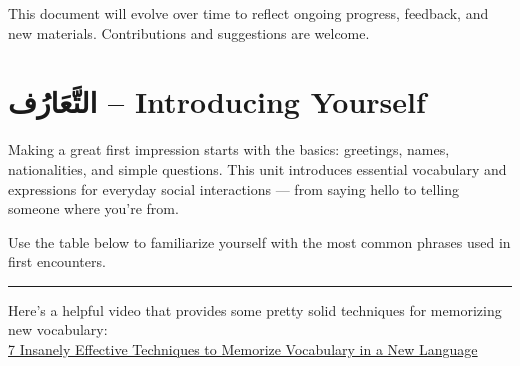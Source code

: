 \documentclass[
  a4paper,
  DIV=11,
  numbers=noendperiod]{scrartcl}
\begin{document}
\begin{tcolorbox}[enhanced jigsaw, bottomrule=.15mm, arc=.35mm, colbacktitle=quarto-callout-important-color!10!white, opacityback=0, toptitle=1mm, title=\textcolor{quarto-callout-important-color}{\faExclamation}\hspace{0.5em}{Note}, colframe=quarto-callout-important-color-frame, opacitybacktitle=0.6, colback=white, coltitle=black, titlerule=0mm, left=2mm, toprule=.15mm, bottomtitle=1mm, rightrule=.15mm, leftrule=.75mm, breakable]

This document will evolve over time to reflect ongoing progress,
feedback, and new materials. Contributions and suggestions are welcome.

\end{tcolorbox}

\section{التَّعَارُف -- Introducing Yourself}\label{unit1-intro}

Making a great first impression starts with the basics: greetings,
names, nationalities, and simple questions. This unit introduces
essential vocabulary and expressions for everyday social interactions
--- from saying hello to telling someone where you're from.

Use the table below to familiarize yourself with the most common phrases
used in first encounters.

\begin{center}\rule{0.5\linewidth}{0.5pt}\end{center}

\begin{tcolorbox}[enhanced jigsaw, bottomrule=.15mm, arc=.35mm, colbacktitle=quarto-callout-tip-color!10!white, opacityback=0, toptitle=1mm, title=\textcolor{quarto-callout-tip-color}{\faLightbulb}\hspace{0.5em}{Watch This!}, colframe=quarto-callout-tip-color-frame, opacitybacktitle=0.6, colback=white, coltitle=black, titlerule=0mm, left=2mm, toprule=.15mm, bottomtitle=1mm, rightrule=.15mm, leftrule=.75mm, breakable]

Here's a helpful video that provides some pretty solid techniques for
memorizing new vocabulary:\\
\href{https://www.youtube.com/watch?v=TZYOScgVc3g&t}{7 Insanely
Effective Techniques to Memorize Vocabulary in a New Language}

\end{tcolorbox}
\end{document}
